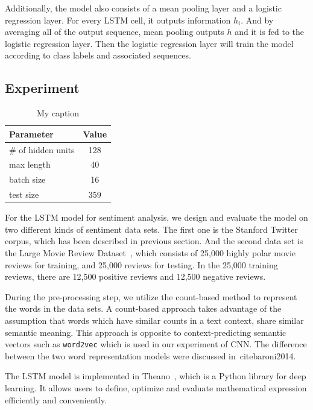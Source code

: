 Additionally, the model also consists of a mean pooling layer and a logistic regression layer. For every LSTM cell, it outputs information $h_i$. And by averaging all of the output sequence, mean pooling outputs $h$ and it is fed to the logistic regression layer. Then the logistic regression layer will train the model according to class labels and associated sequences.

\subsection{Experiment}

\begin{table}[]
	\centering
	\begin{tabular}{|l|c|}
		\hline
		Parameter          & Value \\ \hline
		\# of hidden units & 128   \\ \hline
		max length         & 40    \\ \hline
		batch size         & 16    \\ \hline
		test size          & 359   \\ \hline
	\end{tabular}
	\caption{My caption}
	\label{my-label}
\end{table}

For the LSTM model for sentiment analysis, we design and evaluate the model on two different kinds of sentiment data sets. The first one is the Stanford Twitter corpus, which has been described in previous section. And the second data set is the Large Movie Review Dataset~\cite{maas2011}, which consists of 25,000 highly polar movie reviews for training, and 25,000 reviews for testing. In the 25,000 training reviews, there are 12,500 positive reviews and 12,500 negative reviews.

During the pre-processing step, we utilize the count-based method to represent the words in the data sets. A count-based approach takes advantage of the assumption that words which have similar counts in a text context, share similar semantic meaning. This approach is opposite to context-predicting semantic vectors such as {\tt word2vec} which is used in our experiment of CNN. The difference between the two word representation models were discussed in~cite{baroni2014}. 

The LSTM model is implemented in Theano~\cite{bastien2012, bergstra2010}, which is a Python library for deep learning. It allows users to define, optimize and evaluate mathematical expression efficiently and conveniently. 

